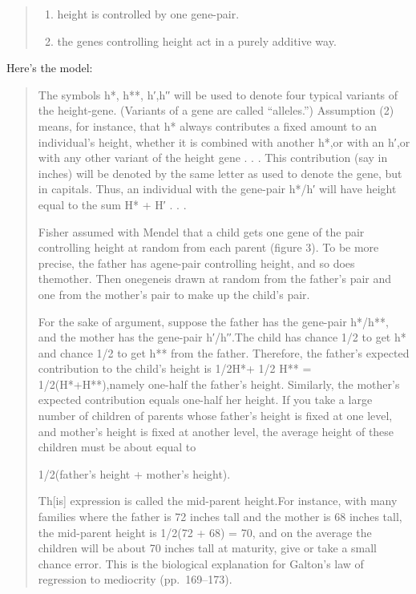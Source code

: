\documentclass[
]{book}
\providecommand{\tightlist}{%
  \setlength{\itemsep}{0pt}\setlength{\parskip}{0pt}}
\begin{document}
\begin{quote}
\begin{enumerate}
\def\labelenumi{\arabic{enumi}.}
\tightlist
\item
  height is controlled by one gene-pair.
\item
  the genes controlling height act in a purely additive way.
\end{enumerate}
\end{quote}

Here's the model:

\begin{quote}
The symbols h*, h**, h′,h′′ will be used to denote four typical variants of the height-gene. (Variants of a gene are called ``alleles.'') Assumption (2) means, for instance, that h* always contributes a fixed amount to an individual's height, whether it is combined with another h*,or with an h′,or with any other variant of the height gene . . . This contribution (say in inches) will be denoted by the same letter as used to denote the gene, but in capitals. Thus, an individual with the gene-pair h*/h′ will have height equal to the sum H* + H′ . . .

Fisher assumed with Mendel that a child gets one gene of the pair controlling height at random from each parent (figure 3). To be more precise, the father has agene-pair controlling height, and so does themother. Then onegeneis drawn at random from the father's pair and one from the mother's pair to make up the child's pair.

For the sake of argument, suppose the father has the gene-pair h*/h**, and the mother has the gene-pair h′/h′′.The child has chance 1/2 to get h* and chance 1/2 to get h** from the father. Therefore, the father's expected contribution to the child's height is 1/2H*+ 1/2 H** = 1/2(H*+H**),namely one-half the father's height. Similarly, the mother's expected contribution equals one-half her height. If you take a large number of children of parents whose father's height is fixed at one level, and mother's height is fixed at another level, the average height of these children must be about equal to

1/2(father's height + mother's height).

Th{[}is{]} expression is called the mid-parent height.For instance, with many families where the father is 72 inches tall and the mother is 68 inches tall, the mid-parent height is 1/2(72 + 68) = 70, and on the average the children will be about 70 inches tall at maturity, give or take a small chance error. This is the biological explanation for Galton's law of regression to mediocrity (pp.~169--173).
\end{quote}
\end{document}
